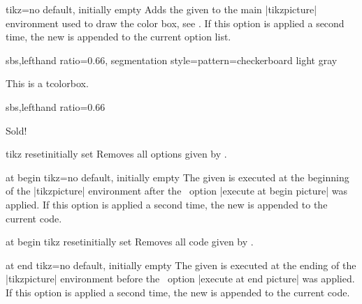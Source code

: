 \begin{docTcbKey}{tikz}{=}{no default, initially empty}
  Adds the given  to the main |tikzpicture| environment
  used to draw the color box, see \cite{tantau:2013a}. If this option is
  applied a second time, the new  is appended to the
  current option list.
\begin{dispExample*}{sbs,lefthand ratio=0.66,
  segmentation style={pattern=checkerboard light gray}}

\begin{tcolorbox}[title=Transparent box,
  tikz={opacity=0.5,transparency group}]
This is a tcolorbox.
\end{tcolorbox}
\end{dispExample*}

\begin{dispExample*}{sbs,lefthand ratio=0.66}

\begin{tcolorbox}[title=Rotated box,
  tikz={rotate=30}]
Sold!
\end{tcolorbox}
\end{dispExample*}

\end{docTcbKey}


\begin{docTcbKey}{tikz reset}{}{initially set}
  Removes all options given by .
\end{docTcbKey}


\begin{docTcbKey}{at begin tikz}{=}{no default, initially empty}
  The given  is executed at the beginning of the |tikzpicture| environment
  after the \tikzname\  option |execute at begin picture| was applied.
  If this option is applied a second time, the new  is appended to the current code.
\end{docTcbKey}


\begin{docTcbKey}{at begin tikz reset}{}{initially set}
  Removes all code given by .
\end{docTcbKey}


\begin{docTcbKey}{at end tikz}{=}{no default, initially empty}
  The given  is executed at the ending of the |tikzpicture| environment
  before the \tikzname\  option |execute at end picture| was applied.
  If this option is applied a second time, the new  is appended to the current code.
\end{docTcbKey}


